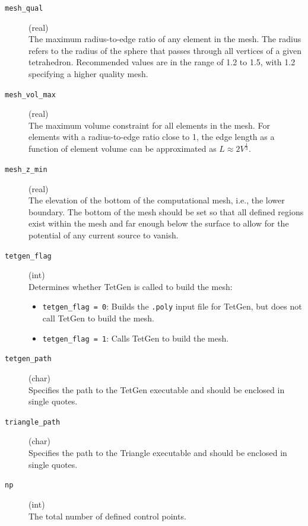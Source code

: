 \documentclass[a4paper,12pt]{article}
\begin{document}
\begin{description}
    \item[\texttt{mesh\_qual}] (real)\hfill \\
          The maximum radius-to-edge ratio of any element in the mesh. The radius refers to the radius of the sphere that passes through all vertices of a given tetrahedron. Recommended values are in the range of 1.2 to 1.5, with 1.2 specifying a higher quality mesh.

    \item[\texttt{mesh\_vol\_max}] (real)\hfill \\
          The maximum volume constraint for all elements in the mesh. For elements with a radius-to-edge ratio close to 1, the edge length as a function of element volume can be approximated as $L \approx 2V^\frac{1}{3}$.

    \item[\texttt{mesh\_z\_min}] (real)\hfill \\
          The elevation of the bottom of the computational mesh, i.e., the lower boundary. The bottom of the mesh should be set so that all defined regions exist within the mesh and far enough below the surface to allow for the potential of any current source to vanish.

    \item[\texttt{tetgen\_flag}] (int)\hfill \\
          Determines whether TetGen is called to build the mesh:
          \begin{itemize}
              \item \texttt{tetgen\_flag = 0}: Builds the \texttt{.poly} input file for TetGen, but does not call TetGen to build the mesh.
              \item \texttt{tetgen\_flag = 1}: Calls TetGen to build the mesh.
          \end{itemize}

    \item[\texttt{tetgen\_path}] (char)\hfill \\
          Specifies the path to the TetGen executable and should be enclosed in single quotes.

    \item[\texttt{triangle\_path}] (char)\hfill \\
          Specifies the path to the Triangle executable and should be enclosed in single quotes.

    \item[\texttt{np}] (int)\hfill \\
          The total number of defined control points.


\end{description}
\end{document}
